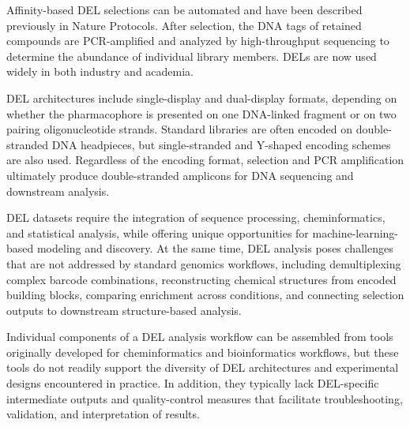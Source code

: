 \documentclass[pdflatex,sn-nature]{sn-jnl}
\begin{document}
Affinity-based DEL selections can be automated and have been described previously in Nature Protocols\cite{decurtins_automatedscreeningsmall_2016}. After selection, the DNA tags of retained compounds are PCR-amplified and analyzed by high-throughput sequencing to determine the abundance of individual library members\cite{decurtins_automatedscreeningsmall_2016,satz_dnaencodedchemicallibraries_2022}. DELs are now used widely in both industry and academia\cite{satz_dnaencodedchemicallibraries_2022,peterson_smallmoleculediscoverydnaencoded_2023,wichert_challengesprospectsdnaencoded_2024,goodnow_dnaencodedchemistryenabling_2017}.

DEL architectures include single-display and dual-display formats, depending on whether the pharmacophore is presented on one DNA-linked fragment or on two pairing oligonucleotide strands\cite{lessing_advancingsmallmoleculedrug_2023}. Standard libraries are often encoded on double-stranded DNA headpieces, but single-stranded and Y-shaped encoding schemes are also used\cite{plais_universalencodingnext_2022}. Regardless of the encoding format, selection and PCR amplification ultimately produce double-stranded amplicons for DNA sequencing and downstream analysis\cite{decurtins_automatedscreeningsmall_2016}.

DEL datasets require the integration of sequence processing, cheminformatics, and statistical analysis, while offering unique opportunities for machine-learning-based modeling and discovery\cite{franzini_chemicalspacednaencoded_2016,mccloskey_machinelearningdnaencoded_2020,reiher_trendshittoleadoptimization_2021,shi_recentadvancesdnaencoded_2022,hou_machinelearningbaseddataanalysis_2023,shmilovich_deldockmoleculardockingenabled_2023,torng_deeplearningapproach_2023,edfeldt_datascienceroadmap_2024,edwards_proteinliganddata_2025,montoya_widespreadfalsenegatives_2025,sigel_dnaencodedlibrarymachine_2025,wang_rationaldesignstrategies_2025,gampe_analysesrecenthitfinding_2026}.
At the same time, DEL analysis poses challenges that are not addressed by standard genomics workflows, including demultiplexing complex barcode combinations, reconstructing chemical structures from encoded building blocks, comparing enrichment across conditions, and connecting selection outputs to downstream structure-based analysis.

Individual components of a DEL analysis workflow can be assembled from tools originally developed for cheminformatics and bioinformatics workflows, but these tools do not readily support the diversity of DEL architectures and experimental designs encountered in practice. In addition, they typically lack DEL-specific intermediate outputs and quality-control measures that facilitate troubleshooting, validation, and interpretation of results.
\end{document}
